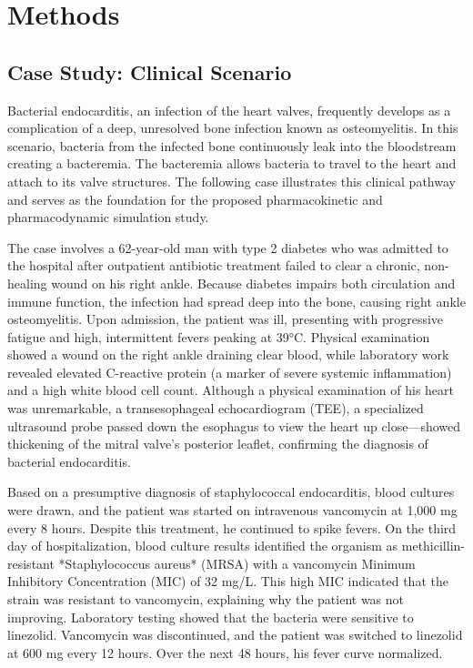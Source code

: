 \documentclass[12pt, draftcls, onecolumn]{IEEEtran}
\begin{document}
\maketitle
\section{Methods}

\subsection{Case Study: Clinical Scenario}
Bacterial endocarditis, an infection of the heart valves, frequently develops as a complication of a deep, unresolved bone infection known as osteomyelitis. In this scenario, bacteria from the infected bone continuously leak into the bloodstream creating a bacteremia. The bacteremia allows bacteria to travel to the heart and attach to its valve structures. The following case illustrates this clinical pathway and serves as the foundation for the proposed pharmacokinetic and pharmacodynamic simulation study.

The case involves a 62-year-old man with type 2 diabetes who was admitted to the hospital after outpatient antibiotic treatment failed to clear a chronic, non-healing wound on his right ankle. Because diabetes impairs both circulation and immune function, the infection had spread deep into the bone, causing right ankle osteomyelitis. Upon admission, the patient was ill, presenting with progressive fatigue and high, intermittent fevers peaking at 39°C. Physical examination showed a wound on the right ankle draining clear blood, while laboratory work revealed elevated C-reactive protein (a marker of severe systemic inflammation) and a high white blood cell count. Although a physical examination of his heart was unremarkable, a transesophageal echocardiogram (TEE), a specialized ultrasound probe passed down the esophagus to view the heart up close—showed thickening of the mitral valve’s posterior leaflet, confirming the diagnosis of bacterial endocarditis.

Based on a presumptive diagnosis of staphylococcal endocarditis, blood cultures were drawn, and the patient was started on intravenous vancomycin at 1,000 mg every 8 hours. Despite this treatment, he continued to spike fevers. On the third day of hospitalization, blood culture results identified the organism as methicillin-resistant *Staphylococcus aureus* (MRSA) with a vancomycin Minimum Inhibitory Concentration (MIC) of 32 mg/L. This high MIC indicated that the strain was resistant to vancomycin, explaining why the patient was not improving. Laboratory testing showed that the bacteria were sensitive to linezolid. Vancomycin was discontinued, and the patient was switched to linezolid at 600 mg every 12 hours. Over the next 48 hours, his fever curve normalized.
\end{document}
